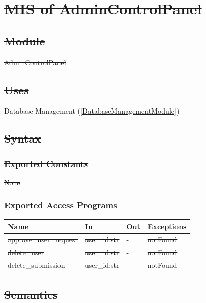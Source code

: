 \documentclass[12pt, titlepage]{article}
\begin{document}
\newpage

\section{\sout{MIS of AdminControlPanel}} \label{AdminControlPanelModule}

\subsection{\sout{Module}}

\sout{AdminControlPanel}

\subsection{\sout{Uses}}


\sout{Database Management} (\ref{DatabaseManagementModule})

\subsection{\sout{Syntax}}

\subsubsection{\sout{Exported Constants}}

\sout{None}

\subsubsection{\sout{Exported Access Programs}}

\begin{center}
\begin{tabular}{p{4cm} p{4cm} p{4cm} p{2cm}}
\hline
\textbf{Name} & \textbf{In} & \textbf{Out} & \textbf{Exceptions} \\
\hline
\sout{approve\_user\_request} & \sout{user\_id:str} & - & \sout{notFound} \\
\sout{delete\_user} & \sout{user\_id:str} & - & \sout{notFound} \\
\sout{delete\_submission} & \sout{user\_id:str} & - & \sout{notFound} \\
\hline
\end{tabular}
\end{center}

\subsection{\sout{Semantics}}
\end{document}
